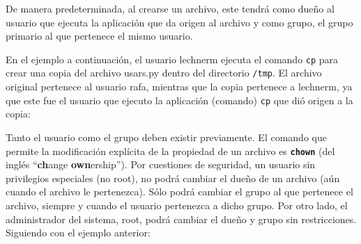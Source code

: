 \documentclass[12pt]{article}
\begin{document}
De manera predeterminada, al crearse un archivo, este tendrá como 
dueño al usuario que ejecuta la aplicación que da origen al archivo y 
como grupo, el grupo primario al que pertenece el mismo usuario. 

En el ejemplo a continuación, el usuario lechnerm ejecuta el comando 
\texttt{cp} para crear una copia del archivo usars.py dentro del directorio
\texttt{/tmp}. El archivo original pertenece al usuario rafa, mientras que
la copia pertenece a lechnerm, ya que este fue el usuario que ejecuto la 
aplicación (comando) \texttt{cp} que dió origen a la copia: 



Tanto el usuario como el grupo deben existir previamente. El comando 
que permite la modificación explícita de la propiedad de un archivo es \textbf{\texttt{chown}}
(del inglés ``\textbf{ch}ange \textbf{own}ership'').
Por cuestiones de seguridad, un usuario sin privilegios especiales (no root), 
no podrá cambiar el dueño de un archivo (aún cuando el archivo le pertenezca). 
Sólo podrá cambiar el grupo al que pertenece el archivo, siempre y cuando el usuario pertenezca a dicho grupo.  
Por otro lado, el administrador del sistema, root, podrá cambiar el dueño
y grupo sin restricciones. Siguiendo con el ejemplo anterior: 
\end{document}

